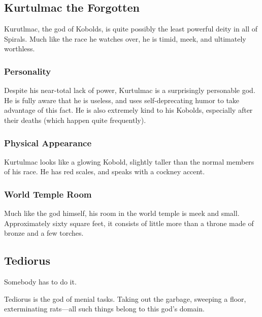 \subsection*{Kurtulmac the Forgotten}
\begin{goddesc}
\end{goddesc}
Kurutlmac, the god of Kobolds, is quite possibly the least powerful deity in all of Spirals.
Much like the race he watches over, he is timid, meek, and ultimately worthless.

\subsubsection*{Personality}
Despite his near-total lack of power, Kurtulmac is a surprisingly personable god.
He is fully aware that he is useless, and uses self-deprecating humor to take advantage of this fact.
He is also extremely kind to his Kobolds, especially after their deaths (which happen quite frequently).

\subsubsection*{Physical Appearance}
Kurtulmac looks like a glowing Kobold, slightly taller than the normal members of his race.
He has red scales, and speaks with a cockney accent.

\subsubsection*{World Temple Room}
Much like the god himself, his room in the world temple is meek and small.
Approximately sixty square feet, it consists of little more than a throne made of bronze and a few torches.

\subsection*{Tediorus}
\begin{goddesc}
\end{goddesc}
\begin{itquote}
Somebody has to do it.
\end{itquote}
Tediorus is the god of menial tasks.
Taking out the garbage, sweeping a floor, exterminating rats---all such things belong to this god's domain.

